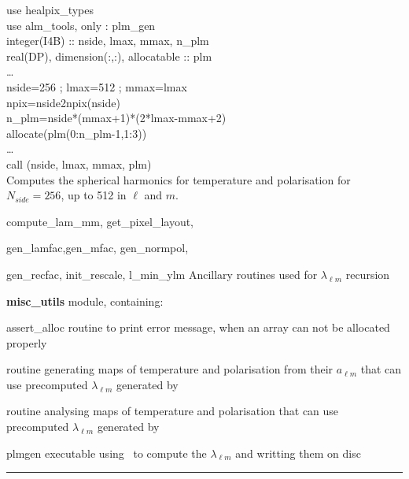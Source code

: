\begin{example}
{
use healpix\_types \\
use alm\_tools, only : plm\_gen \\
integer(I4B) :: nside, lmax, mmax, n\_plm\\
real(DP), dimension(:,:), allocatable :: plm \\
\ldots \\
nside=256 ; lmax=512 ; mmax=lmax\\
npix=nside2npix(nside)\\
n\_plm=nside*(mmax+1)*(2*lmax-mmax+2)\\
allocate(plm(0:n\_plm-1,1:3))\\
\ldots \\
call \thedocid(nside, lmax, mmax, plm)  \\
}
{
Computes the spherical harmonics for temperature and polarisation for $N_{side}= 256$, up to 512 in $\ell$ and $m$.
}
\end{example}

\begin{modules}
  \begin{sulist}{} %
  \item[compute\_lam\_mm, get\_pixel\_layout, ]
  \item[gen\_lamfac,gen\_mfac, gen\_normpol, ] 
  \item[gen\_recfac, init\_rescale, l\_min\_ylm] Ancillary routines used
  for $\lambda_{\ell m}$ recursion
  \item[\textbf{misc\_utils}] module, containing:
  \item[assert\_alloc] routine to print error message, when an array can not be
  allocated properly
  \end{sulist}
\end{modules}

\begin{related}
  \begin{sulist}{} %
   \item[\htmlref{alm2map}{sub:alm2map}] routine generating maps of temperature
   and polarisation from their $a_{\ell m}$ that can use precomputed $\lambda_{\ell
   m}$ generated by \thedocid
   \item[\htmlref{map2alm}{sub:map2alm}] routine analysing maps of temperature
   and polarisation that can use precomputed $\lambda_{\ell
   m}$ generated by \thedocid
  \item[plmgen] executable using \thedocid\ to compute the $\lambda_{\ell m}$ and
  writting them on disc 
  \end{sulist}
\end{related}

\rule{\hsize}{2mm}

\newpage
